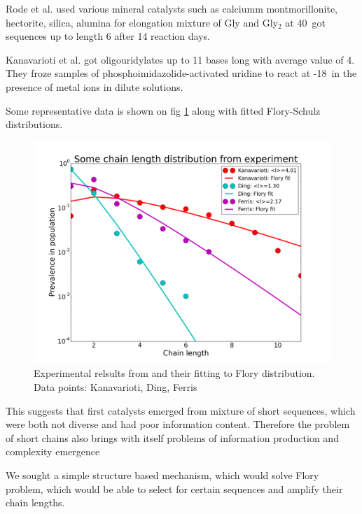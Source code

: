\documentclass[journal=jacsat,manuscript=article,layout=twocolumn]{achemso}
\begin{document}
Rode et al.\cite{Rode1997,Rode1999} used various mineral catalysts such as calciumm 
montmorillonite, hectorite,  silica, alumina for elongation mixture of Gly and Gly$_2$ at 
40\textcelsius\, got sequences up to length 6 after 14 reaction days.

Kanavarioti et al.\cite{Kanavarioti2001} got oligouridylates up to 11 bases long with average 
value of 4. They froze samples of phosphoimidazolide-activated uridine to react at 
-18\textcelsius\, in the presence of metal ions in dilute solutions.

Some representative data is shown on fig \ref{fig:some_flory} along with fitted Flory-Schulz 
distributions.
\begin{figure}[h!]
  \centering
  \includegraphics[width=\columnwidth]{pictures/some_flory.png} 
  \caption{Experimental relsults from \cite{Kanavarioti2001} and their fitting to Flory 
distribution. Data points: Kanavarioti\cite{Kanavarioti2001}, Ding\cite{Ding1996}, 
Ferris\cite{Ferris1999} }
  \label{fig:some_flory}
\end{figure}



This suggests that first catalysts emerged from mixture of short sequences, which were both 
not diverse and had poor information content. Therefore the problem of short chains also brings 
with itself problems of information production and complexity emergence \cite{Joyce1987,Abel2005}

 We sought a simple structure based mechanism, 
which would solve Flory problem, which would be able to select for certain sequences and 
amplify their chain lengths.
\end{document}
